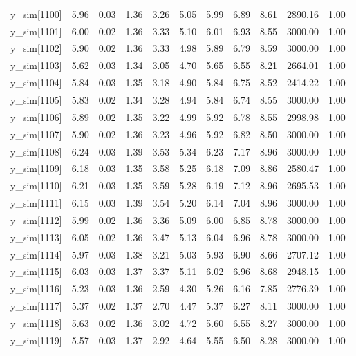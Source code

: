\begin{table}[ht]
\begin{tabular}{rrrrrrrrrrr}
  y\_sim[1100] & 5.96 & 0.03 & 1.36 & 3.26 & 5.05 & 5.99 & 6.89 & 8.61 & 2890.16 & 1.00 \\ 
  y\_sim[1101] & 6.00 & 0.02 & 1.36 & 3.33 & 5.10 & 6.01 & 6.93 & 8.55 & 3000.00 & 1.00 \\ 
  y\_sim[1102] & 5.90 & 0.02 & 1.36 & 3.33 & 4.98 & 5.89 & 6.79 & 8.59 & 3000.00 & 1.00 \\ 
  y\_sim[1103] & 5.62 & 0.03 & 1.34 & 3.05 & 4.70 & 5.65 & 6.55 & 8.21 & 2664.01 & 1.00 \\ 
  y\_sim[1104] & 5.84 & 0.03 & 1.35 & 3.18 & 4.90 & 5.84 & 6.75 & 8.52 & 2414.22 & 1.00 \\ 
  y\_sim[1105] & 5.83 & 0.02 & 1.34 & 3.28 & 4.94 & 5.84 & 6.74 & 8.55 & 3000.00 & 1.00 \\ 
  y\_sim[1106] & 5.89 & 0.02 & 1.35 & 3.22 & 4.99 & 5.92 & 6.78 & 8.55 & 2998.98 & 1.00 \\ 
  y\_sim[1107] & 5.90 & 0.02 & 1.36 & 3.23 & 4.96 & 5.92 & 6.82 & 8.50 & 3000.00 & 1.00 \\ 
  y\_sim[1108] & 6.24 & 0.03 & 1.39 & 3.53 & 5.34 & 6.23 & 7.17 & 8.96 & 3000.00 & 1.00 \\ 
  y\_sim[1109] & 6.18 & 0.03 & 1.35 & 3.58 & 5.25 & 6.18 & 7.09 & 8.86 & 2580.47 & 1.00 \\ 
  y\_sim[1110] & 6.21 & 0.03 & 1.35 & 3.59 & 5.28 & 6.19 & 7.12 & 8.96 & 2695.53 & 1.00 \\ 
  y\_sim[1111] & 6.15 & 0.03 & 1.39 & 3.54 & 5.20 & 6.14 & 7.04 & 8.96 & 3000.00 & 1.00 \\ 
  y\_sim[1112] & 5.99 & 0.02 & 1.36 & 3.36 & 5.09 & 6.00 & 6.85 & 8.78 & 3000.00 & 1.00 \\ 
  y\_sim[1113] & 6.05 & 0.02 & 1.36 & 3.47 & 5.13 & 6.04 & 6.96 & 8.78 & 3000.00 & 1.00 \\ 
  y\_sim[1114] & 5.97 & 0.03 & 1.38 & 3.21 & 5.03 & 5.93 & 6.90 & 8.66 & 2707.12 & 1.00 \\ 
  y\_sim[1115] & 6.03 & 0.03 & 1.37 & 3.37 & 5.11 & 6.02 & 6.96 & 8.68 & 2948.15 & 1.00 \\ 
  y\_sim[1116] & 5.23 & 0.03 & 1.36 & 2.59 & 4.30 & 5.26 & 6.16 & 7.85 & 2776.39 & 1.00 \\ 
  y\_sim[1117] & 5.37 & 0.02 & 1.37 & 2.70 & 4.47 & 5.37 & 6.27 & 8.11 & 3000.00 & 1.00 \\ 
  y\_sim[1118] & 5.63 & 0.02 & 1.36 & 3.02 & 4.72 & 5.60 & 6.55 & 8.27 & 3000.00 & 1.00 \\ 
  y\_sim[1119] & 5.57 & 0.03 & 1.37 & 2.92 & 4.64 & 5.55 & 6.50 & 8.28 & 3000.00 & 1.00 \\ 

\end{tabular}
\end{table}
